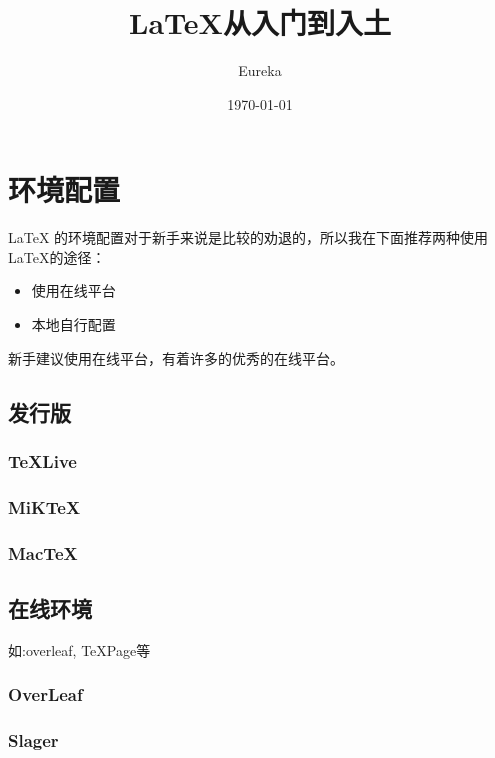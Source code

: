 \documentclass[12pt]{article}
\title{\LaTeX{}从入门到入土}
\author{Eureka}
\date{\today}
\begin{document}
\begin{titlepage}
    \maketitle
\end{titlepage}
\clearpage


\begin{center}
    \tableofcontents    
\end{center}
\thispagestyle{empty}
\setcounter{page}{0}
\clearpage


\section{环境配置}
\LaTeX{} 的环境配置对于新手来说是比较的劝退的，所以我在下面推荐两种使用\LaTeX{}的途径：
\begin{itemize}
    \item 使用在线平台
    \item 本地自行配置
\end{itemize}

新手建议使用在线平台，有着许多的优秀的在线平台。


\subsection{发行版}

\subsubsection{TeXLive}

\subsubsection{MiKTeX}

\subsubsection{MacTeX}

\subsection{在线环境}
如:overleaf, TeXPage等
\subsubsection{OverLeaf}

\subsubsection{Slager}
\end{document}

